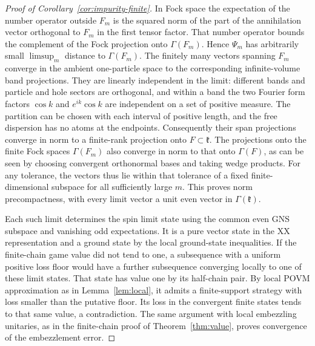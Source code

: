 \begin{proof}[Proof of Corollary~\ref{cor:impurity-finite}]
In Fock space the expectation of the number operator outside $F_m$ is
the squared norm of the part of the annihilation vector orthogonal to
$F_m$ in the first tensor factor. That number operator bounds the
complement of the Fock projection onto $\Gamma(F_m)$. Hence $\Psi_m$
has arbitrarily small $\limsup_m$ distance to $\Gamma(F_m)$.
The finitely many vectors spanning $F_m$ converge in the ambient
one-particle space to the corresponding infinite-volume band projections.
They are linearly independent in the limit: different bands and particle
and hole sectors are orthogonal, and within a band the two Fourier
form factors $\cos k$ and $e^{ik}\cos k$ are independent on a set of
positive measure. The partition can be chosen with each interval of
positive length, and the free dispersion has no atoms at the endpoints.
Consequently their span projections converge in norm to a finite-rank
projection onto $F\subset\mathfrak k$. The projections onto the finite
Fock spaces $\Gamma(F_m)$ also converge in norm to that onto $\Gamma(F)$,
as can be seen by choosing convergent orthonormal bases and taking wedge
products. For any tolerance, the vectors thus lie within that tolerance
of a fixed finite-dimensional subspace for all sufficiently large $m$.
This proves norm precompactness, with every limit vector a unit even
vector in $\Gamma(\mathfrak k)$.

Each such limit determines the spin limit state using the common even
GNS subspace and vanishing odd expectations. It is a pure vector state
in the XX representation and a ground state by the local ground-state
inequalities. If the finite-chain game value did not tend to one, a
subsequence with a uniform positive loss floor would have a further
subsequence converging locally to one of these limit states. That state
has value one by its half-chain pair. By local POVM approximation as in
Lemma~\ref{lem:local}, it admits a finite-support strategy with loss smaller
than the putative floor. Its loss in the convergent finite states tends
to that same value, a contradiction. The same argument with local embezzling unitaries, as in the finite-chain proof of Theorem~\ref{thm:value}, proves convergence of the embezzlement error.
\end{proof}
